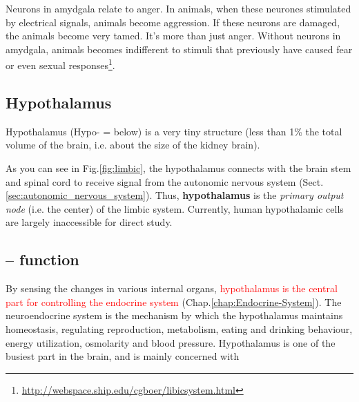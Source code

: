 Neurons in amydgala relate to anger. In animals, when these neurones stimulated
by electrical signals, animals become aggression. If these neurons are damaged,
the animals become very tamed. It's more than just anger. Without neurons in
amydgala, animals becomes indifferent to stimuli that previously have caused
fear or even sexual
responses\footnote{\url{http://webspace.ship.edu/cgboer/libicsystem.html}}.


\subsection{Hypothalamus}
\label{sec:hypothalamus}

Hypothalamus (Hypo- = below) is a very tiny structure (less than 1\% the total
volume of the brain, i.e. about the size of the kidney brain).


As you can see in Fig.\ref{fig:limbic}, the hypothalamus connects with the brain
stem and spinal cord to receive signal from the autonomic nervous system
(Sect.\ref{sec:autonomic_nervous_system}). Thus, {\bf hypothalamus} is the {\it
primary output node} (i.e. the center) of the limbic system.
Currently, human hypothalamic cells are largely inaccessible for direct
study.

\subsection{-- function}
\label{sec:hypothalamus-functions}

By sensing the changes in various internal organs, \textcolor{red}{hypothalamus
is the central part for controlling the endocrine system}
(Chap.\ref{chap:Endocrine-System}). The neuroendocrine system is the mechanism
by which the hypothalamus maintains homeostasis, regulating reproduction,
metabolism, eating and drinking behaviour, energy utilization, osmolarity and
blood pressure. Hypothalamus is one of the busiest part in the brain, and is
mainly concerned with

